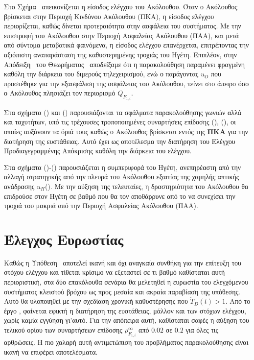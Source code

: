 \bigskip
\begin{observation}\label{fig:obs:2}
Στο Σχήμα~ απεικονίζεται η είσοδος ελέγχου του Ακόλουθου. Όταν ο Ακόλουθος βρίσκεται στην Περιοχή Κινδύνου Ακόλουθου (ΠΚΑ), η είσοδος ελέγχου περιορίζεται, καθώς δίνεται προτεραιότητα στην ασφάλεια του συστήματος. Με την επιστροφή του Ακόλουθου στην Περιοχή Ασφαλείας Ακόλουθου (ΠΑΑ), και μετά από σύντομα μεταβατικά φαινόμενα, η είσοδος ελέγχου επανέρχεται, επιτρέποντας την αξιόπιστη αναπαράσταση της καθυστερημένης τροχιάς του Ηγέτη. Επιπλέον, στην Απόδειξη~ του Θεωρήματος~ αποδείξαμε ότι η παρακολούθηση παραμένει φραγμένη καθόλη την διάρκεια του διμερούς τηλεχειρισμού, ενώ ο παράγοντας $u_{O}$ που προστέθηκε για την εξασφάλιση της ασφάλειας του Ακόλουθου, τείνει στο άπειρο όσο ο Ακόλουθος πλησιάζει τον περιορισμό $Q_{F_{1, i}}$.
\end{observation}

\bigskip
\begin{observation}\label{fig:obs:3}
Στα σχήματα () και () παρουσιάζονται τα σφάλματα παρακολούθησης γωνιών αλλά και ταχυτήτων, υπό τις τρέχουσες τροποποιημένες συναρτήσεις επίδοσης (), (), οι οποίες αυξάνουν τα όριά τους καθώς ο Ακόλουθος βρίσκεται εντός της \textbf{ΠΚΑ} για την διατήρηση της ευστάθειας. Αυτό έχει ως αποτέλεσμα την διατήρηση του Ελέγχου Προδιαγεγραμμένης Απόκρισης καθόλη την διάρκεια του ελέγχου.
\end{observation}

\bigskip
\begin{observation}\label{fig:obs:4}
Στα σχήματα ()-() παρουσιάζεται η συμπεριφορά του Ηγέτη, ανεπηρέαστη από την αλλαγή στρατηγικής από την πλευρά του Ακόλουθου εξαιτίας της χαμηλής απτικής ανάδρασης $u_{H}$(). Με την αύξηση της τελευταίες, η δραστηριότητα του Ακόλουθου θα επιδρούσε στον Ηγέτη σε βαθμό που θα τον αποθάρρυνε από το να συνεχίσει την τροχιά του μακριά από την Περιοχή Ασφαλείας Ακόλουθου (ΠΑΑ).
\end{observation}

\section{Έλεγχος Ευρωστίας} \label{Chapter3Section3}
Καθώς η Υπόθεση~ αποτελεί ικανή και όχι αναγκαία συνθήκη για την επίτευξη του στόχου ελέγχου και τίθεται κρίσιμο να εξεταστεί σε τι βαθμό καθίσταται αυτή περιοριστική, στα δύο επακόλουθα σενάρια θα μελετηθεί η ευρωστία του ελεγχόμενου συστήματος κλειστού βρόχου ως προς μεσαία και ακραία παραβίαση της υπόθεσης. Αυτό θα υλοποιηθεί με την σχεδίαση χρονική καθυστέρησης που $\dot{T}_D(t) > 1$. Από το έργο \cite{bresch2018robust}, φαίνεται εφικτή η διατήρηση της ευστάθειας, μάλλον και των στόχων ελέγχου, χωρίς καμία εγγύηση γι'αυτό.
Για την απόπειρα αυτή, καθίσταται σαφές η αύξηση του τελικού ορίου των συναρτήσεων επίδοσης $\rho^{\infty}_{F_{1,i}}$ από $\mathbf{0.02}$ σε $\mathbf{0.2}$ για όλες τις αρθρώσεις. Η πιο χαλαρή αυτή αντιμετώπιση του προβλήματος παρακολούθησης είναι ικανή να επιφέρει αποτελέσματα.

